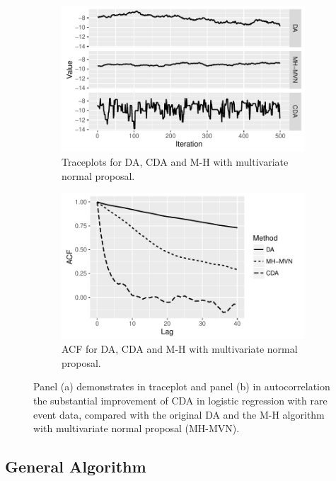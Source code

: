 \documentclass[10pt]{article}
\begin{document}
\begin{figure}[H]
  \begin{subfigure}[b]{0.49\textwidth}
 \includegraphics[width=1\textwidth]{logit_demo_trace_plot}
  \caption{Traceplots for DA, CDA and M-H with multivariate normal proposal.}
\end{subfigure}
  \hfill
   \begin{subfigure}[b]{0.49\textwidth}
 \includegraphics[width=1\textwidth]{logit_demo_acf}
  \caption{ACF for DA, CDA and M-H with multivariate normal proposal.}
\end{subfigure}
 \caption{Panel (a) demonstrates in traceplot and panel (b) in autocorrelation the substantial improvement of CDA in logistic regression with rare event data, compared with the original DA \citep{polson2013bayesian} and the M-H algorithm with multivariate normal proposal (MH-MVN).}
    \label{logit_random_mixing}
 \end{figure}

\subsection{General Algorithm}
\end{document}
